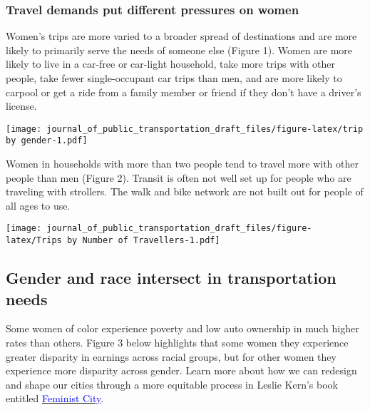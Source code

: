 \documentclass[
  12pt,
]{article}
\begin{document}
\hypertarget{travel-demands-put-different-pressures-on-women}{%
\subsubsection{Travel demands put different pressures on
women}\label{travel-demands-put-different-pressures-on-women}}

\begin{flushleft}
Women's trips are more varied to a broader spread of destinations and are more likely to primarily serve the needs of someone else (Figure 1). Women are more likely to live in a car-free or car-light household, take more trips with other people, take fewer single-occupant car trips than men, and are more likely to carpool or get a ride from a family member or friend if they don’t have a driver’s license. 
\end{flushleft}

\texttt{[image: journal\_of\_public\_transportation\_draft\_files/figure-latex/trip by gender-1.pdf]}

\begin{flushleft}
Women in households with more than two people tend to travel more with other people than men (Figure 2). Transit is often not well set up for people who are traveling with strollers. The walk and bike network are not built out for people of all ages to use.
\end{flushleft}

\texttt{[image: journal\_of\_public\_transportation\_draft\_files/figure-latex/Trips by Number of Travellers-1.pdf]}
\newpage \pagestyle{otherpages} \setlength{\headheight}{10pt}
\setlength{\textheight}{665pt} \fancyhead[L]{}

\hypertarget{gender-and-race-intersect-in-transportation-needs}{%
\subsection{Gender and race intersect in transportation
needs}\label{gender-and-race-intersect-in-transportation-needs}}

Some women of color experience poverty and low auto ownership in much
higher rates than others. Figure 3 below highlights that some women they
experience greater disparity in earnings across racial groups, but for
other women they experience more disparity across gender. Learn more
about how we can redesign and shape our cities through a more equitable
process in Leslie Kern's book entitled
\href{https://metropolismag.com/viewpoints/leslie-kern-feminist-city/}{\underline{\textcolor{blue}{Feminist City}}}.
\end{document}
